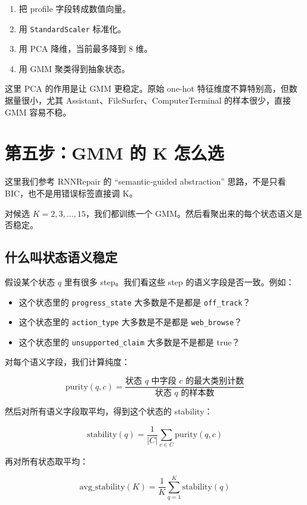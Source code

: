 \documentclass[UTF8,a4paper,11pt]{ctexart}
\begin{document}
\begin{enumerate}
  \item 把 profile 字段转成数值向量。
  \item 用 \texttt{StandardScaler} 标准化。
  \item 用 PCA 降维，当前最多降到 8 维。
  \item 用 GMM 聚类得到抽象状态。
\end{enumerate}

这里 PCA 的作用是让 GMM 更稳定。原始 one-hot 特征维度不算特别高，但数据量很小，尤其 Assistant、FileSurfer、ComputerTerminal 的样本很少，直接 GMM 容易不稳。

\section{第五步：GMM 的 K 怎么选}

这里我们参考 RNNRepair 的 ``semantic-guided abstraction'' 思路，不是只看 BIC，也不是用错误标签直接调 K。

对候选 $K=2,3,\ldots,15$，我们都训练一个 GMM。然后看聚出来的每个状态语义是否稳定。

\subsection{什么叫状态语义稳定}

假设某个状态 $q$ 里有很多 step。我们看这些 step 的语义字段是否一致。例如：

\begin{itemize}
  \item 这个状态里的 \texttt{progress\_state} 大多数是不是都是 \texttt{off\_track}？
  \item 这个状态里的 \texttt{action\_type} 大多数是不是都是 \texttt{web\_browse}？
  \item 这个状态里的 \texttt{unsupported\_claim} 大多数是不是都是 true？
\end{itemize}

对每个语义字段，我们计算纯度：

\[
\text{purity}(q, c) =
\frac{\text{状态 }q\text{ 中字段 }c\text{ 的最大类别计数}}
{\text{状态 }q\text{ 的样本数}}
\]

然后对所有语义字段取平均，得到这个状态的 stability：

\[
\text{stability}(q) =
\frac{1}{|C|}\sum_{c\in C}\text{purity}(q,c)
\]

再对所有状态取平均：

\[
\text{avg\_stability}(K) =
\frac{1}{K}\sum_{q=1}^{K}\text{stability}(q)
\]
\end{document}
